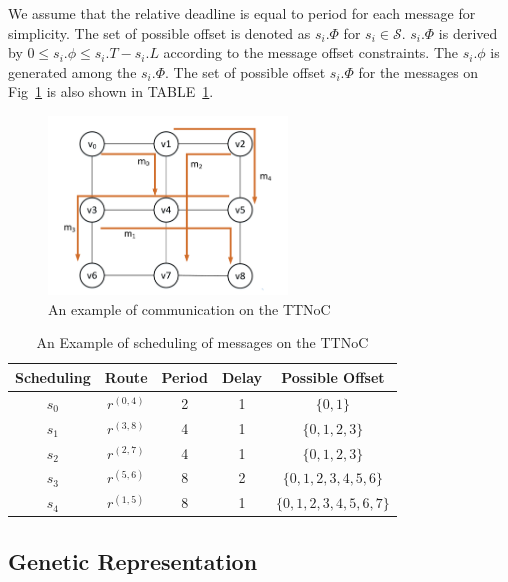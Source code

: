 \documentclass[journal]{IEEEtran}
\newcommand{\calS}{\mathcal{S}}
\begin{document}
We assume that the relative deadline is equal to period for each message for simplicity.
The set of possible offset is denoted as $s_i.\Phi$ for $s_i\in\calS$.
$s_i.\Phi$ is derived by $ 0 \leq s_{i}.\phi \leq s_{i}.T - s_{i}.L $ according to the message offset constraints.
The $s_i.\phi$ is generated among the $s_i.\Phi$.
The set of possible offset $s_i.\Phi$ for the messages on Fig~\ref{f:comm_on_TTNoC} is also shown in TABLE~\ref{t:comm_info}.
\begin{figure}[!t]
	\centering
	\includegraphics[width=2.5in]{picture/scheduling_example.pdf}
	\caption{An example of communication on the TTNoC}
	\label{f:comm_on_TTNoC}
\end{figure}
\begin{table}[!t]
	\renewcommand{\arraystretch}{1.3}
	\caption{An Example of scheduling of messages on the TTNoC}
	\label{t:comm_info}
	\centering
	\begin{tabular}{|c||c||c||c||c|}
		\hline
			\textbf{Scheduling } & 
			\textbf{Route } & 
			\textbf{Period} & 
			\textbf{Delay } & 
			\textbf{Possible Offset}\\
		\hline
		$s_{0}$ & $ r^{(0,4)} $ & 2 & 1 & $\{0,1\}$\\
		\hline
		$s_{1}$ & $ r^{(3,8)} $ & 4 & 1 & $\{0,1,2,3\}$\\
		\hline
		$s_{2}$ & $ r^{(2,7) }$ & 4 & 1 & $\{0,1,2,3\}$\\
		\hline		
		$s_{3}$ & $ r^{(5,6) }$ & 8 & 2 & $\{0,1,2,3,4,5,6\}$\\
		\hline
		$s_{4}$ & $ r^{(1,5) }$ & 8 & 1 & $\{0,1,2,3,4,5,6,7\}$\\
		\hline		
	\end{tabular}
\end{table}
\subsection{Genetic Representation}
\end{document}
